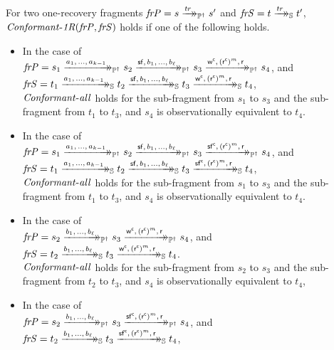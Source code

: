 \begin{definition}
    For two one-recovery fragments $\mathit{frP} = s \xrightarrow{\mathit{tr}}\mathrel{\mkern-14mu}\rightarrow_{\mathbb P^\dagger} s'$ and $\mathit{frS} = t \xrightarrow{\mathit{tr}}\mathrel{\mkern-14mu}\rightarrow_{\mathbb S} t'$, $\mathit{Conformant\text{-}1R}(\mathit{frP},\mathit{frS})$ holds if one of the following holds.
    \begin{itemize}
        \item In the case of\\ $\id{frP} = s_1 \ttsPI{a_1,\, \ldots,\, a_{k-1}} s_2 \ttsPI{\actf,\, b_1,\, \ldots,\, b_\ell} s_3 \ttsPI{\actwc,\, (\actrc)^m,\, \actr} s_4$, and \\
        $\id{frS} = t_1 \ttsS{a_1,\, \ldots,\, a_{k-1}} t_2 \ttsS{\actf,\, b_1,\, \ldots,\, b_\ell} t_3 \ttsS{\actwc,\, (\actrc)^m,\, \actr} t_4$,\\
        $\mathit{Conformant\text{-}all}$ holds for the sub-fragment from $s_1$ to $s_3$ and the sub-fragment from $t_1$ to $t_3$, and $s_4$ is observationally equivalent to $t_4$.
        \item In the case of\\ $\id{frP} = s_1 \ttsPI{a_1,\, \ldots,\, a_{k-1}} s_2 \ttsPI{\actf,\, b_1,\, \ldots,\, b_\ell} s_3 \ttsPI{\actfc,\, (\actrc)^m,\, \actr} s_4$, and \\
        $\id{frS} = t_1 \ttsS{a_1,\, \ldots,\, a_{k-1}} t_2 \ttsS{\actf,\, b_1,\, \ldots,\, b_\ell} t_3 \ttsS{\actfc,\, (\actrc)^m,\, \actr} t_4$,\\
        $\mathit{Conformant\text{-}all}$ holds for the sub-fragment from $s_1$ to $s_3$ and the sub-fragment from $t_1$ to $t_3$, and $s_4$ is observationally equivalent to $t_4$.
        \item  In the case of\\ $\mathit{frP} = s_2 \xrightarrow{b_1,\, \ldots,\, b_\ell}\mathrel{\mkern-14mu}\rightarrow_{\mathbb P^\dagger} s_3 \xrightarrow{\mathsf w^\mathsf{c},\, (\mathsf{r^c})^m,\, \mathsf r}\mathrel{\mkern-14mu}\rightarrow_{\mathbb P^\dagger} s_4$, and \\
        $\mathit{frS} = t_2 \xrightarrow{b_1,\, \ldots,\, b_\ell}\mathrel{\mkern-14mu}\rightarrow_{\mathbb S} t_3 \xrightarrow{\mathsf w^\mathsf{c},\, (\mathsf{r^c})^m,\, \mathsf r}\mathrel{\mkern-14mu}\rightarrow_{\mathbb S} t_4$.\\
        $\mathit{Conformant\text{-}all}$ holds for the sub-fragment from $s_2$ to $s_3$ and the sub-fragment from $t_2$ to $t_3$, and $s_4$ is observationally equivalent to $t_4$,
        \item In the case of\\ $\mathit{frP} = s_2 \xrightarrow{b_1,\, \ldots,\, b_\ell}\mathrel{\mkern-14mu}\rightarrow_{\mathbb P^\dagger} s_3 \xrightarrow{\mathsf{sf^c},\, (\mathsf{r^c})^m,\, \mathsf r}\mathrel{\mkern-14mu}\rightarrow_{\mathbb P^\dagger} s_4$, and \\
        $\mathit{frS} = t_2 \xrightarrow{b_1,\, \ldots,\, b_\ell}\mathrel{\mkern-14mu}\rightarrow_{\mathbb S} t_3 \xrightarrow{\mathsf{sf^c},\, (\mathsf{r^c})^m,\, \mathsf r}\mathrel{\mkern-14mu}\rightarrow_{\mathbb S} t_4$,\\

\end{itemize}
\end{definition}

